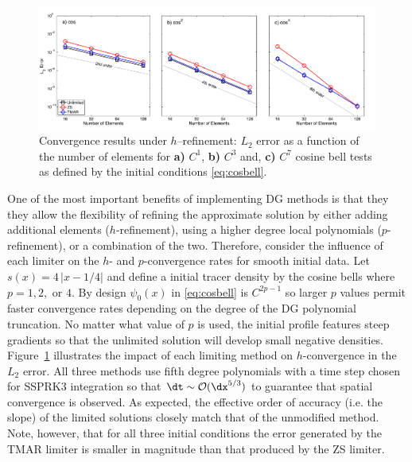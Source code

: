 \documentclass{ametsoc}
\begin{document}
\begin{figure}
\includegraphics[width=\textwidth]{figs/1d/cosbell_hConvg_nodal.pdf}
\caption{Convergence results under $h$--refinement: $L_2$ error as a function of the number of elements for {\bf a)} $C^1$, {\bf b)} $C^3$ and, {\bf c)} $C^7$ cosine bell tests as defined by the initial conditions \eqref{eq:cosbell}. } \label{fig:cosConv-h}
\end{figure}

One of the most important benefits of implementing DG methods is that they they allow the flexibility of refining the approximate solution by either adding additional elements ($h$-refinement), using a higher degree local polynomials ($p$-refinement), or a combination of the two. Therefore, consider the influence of each limiter on the $h$- and $p$-convergence rates for smooth initial data. Let $s(x) = 4 \, |x-1/4|$ and define a  initial tracer density by the cosine bells
where  $p=1,2,$ or $4$.  By design $\psi_0(x)$ in \eqref{eq:cosbell} is $C^{2p-1}$ so larger $p$ values permit faster convergence rates depending on the degree of the DG polynomial truncation. No matter what value of $p$ is used, the initial profile features steep gradients so that the unlimited solution will develop small negative densities. Figure~\ref{fig:cosConv-h} illustrates the impact of each limiting method on $h$-convergence in the $L_2$ error. All three methods use fifth degree polynomials with a time step chosen for SSPRK3 integration so that $\dt \sim \mathcal{O} ( \dx^{5/3} )$ to guarantee that spatial convergence is observed. As expected, the effective order of accuracy (i.e. the slope) of the limited solutions closely match that of the unmodified method. Note, however, that for all three initial conditions the error generated by the TMAR limiter is smaller in magnitude than that produced by the ZS limiter. 
\end{document}
